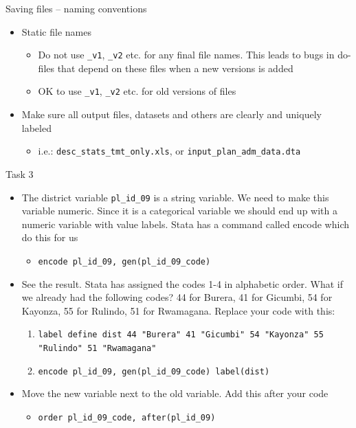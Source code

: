 \documentclass[aspectratio=169]{beamer}
\begin{document}
\begin{frame}{Saving files – naming conventions}
	\begin{itemize}
		\item Static file names
		\begin{itemize}
			\item 	Do not use \texttt{\_v1}, \texttt{\_v2} etc. for any final file names. This leads to bugs in do-files that depend on these files when a new versions is added
			\item OK to use \texttt{\_v1}, \texttt{\_v2} etc. for old versions of files
		\end{itemize}
		\item Make sure all output files, datasets and others are clearly and uniquely labeled
		\begin{itemize}
			\item  i.e.: \texttt{desc\_stats\_tmt\_only.xls}, or \texttt{input\_plan\_adm\_data.dta}
		\end{itemize}
	\end{itemize}
\end{frame}

\begin{frame}{Task 3}
	\begin{itemize}
		\item The district variable \texttt{pl\_id\_09} is a string variable. We need to make this variable numeric. Since it is a categorical variable we should end up with a numeric variable with value labels. Stata has a command called encode which do this for us
		\begin{itemize}
			\item \texttt{encode  pl\_id\_09,  gen(pl\_id\_09\_code)}
		\end{itemize}
		\item See the result. Stata has assigned the codes 1-4 in alphabetic order. What if we already had the following codes? 44 for Burera, 41  for Gicumbi, 54 for Kayonza,  55 for Rulindo, 51 for Rwamagana. Replace your code with this:
		\begin{enumerate}
			\item 	\texttt{label define dist 44 "Burera" 41 "Gicumbi" 54 "Kayonza" 55 "Rulindo" 51 "Rwamagana"}
			\item   \texttt{encode  pl\_id\_09,  gen(pl\_id\_09\_code) label(dist)}
		\end{enumerate}
		\item Move the new variable next to the old variable. Add this after your code
		\begin{itemize}
			\item \texttt{order pl\_id\_09\_code, after(pl\_id\_09)}
		\end{itemize}
	\end{itemize}
\end{frame}
\end{document}
